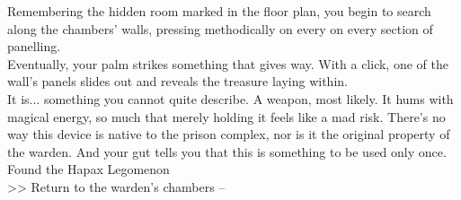 Remembering the hidden room marked in the floor plan, you begin to search along the chambers' walls, pressing methodically on every on every section of panelling.\\

Eventually, your palm strikes something that gives way. With a click, one of the wall’s panels slides out and reveals the treasure laying within.\\

It is... something you cannot quite describe. A weapon, most likely. It hums with magical energy, so much that merely holding it feels like a mad risk. There’s no way this device is native to the prison complex, nor is it the original property of the warden. And your gut tells you that this is something to be used only once.\\
 Found the Hapax Legomenon\\

>> Return to the warden’s chambers -- 